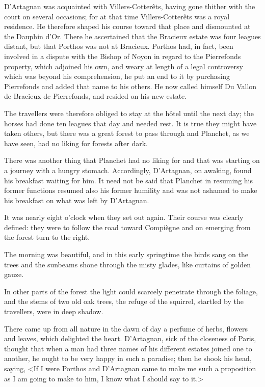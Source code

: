 D'Artagnan was acquainted with Villers-Cotterêts, having gone thither with the court on several occasions; for at that time Villers-Cotterêts was a royal residence. He therefore shaped his course toward that place and dismounted at the Dauphin d'Or. There he ascertained that the Bracieux estate was four leagues distant, but that Porthos was not at Bracieux. Porthos had, in fact, been involved in a dispute with the Bishop of Noyon in regard to the Pierrefonds property, which adjoined his own, and weary at length of a legal controversy which was beyond his comprehension, he put an end to it by purchasing Pierrefonds and added that name to his others. He now called himself Du Vallon de Bracieux de Pierrefonds, and resided on his new estate.

The travellers were therefore obliged to stay at the hôtel until the next day; the horses had done ten leagues that day and needed rest. It is true they might have taken others, but there was a great forest to pass through and Planchet, as we have seen, had no liking for forests after dark.

There was another thing that Planchet had no liking for and that was starting on a journey with a hungry stomach. Accordingly, D'Artagnan, on awaking, found his breakfast waiting for him. It need not be said that Planchet in resuming his former functions resumed also his former humility and was not ashamed to make his breakfast on what was left by D'Artagnan.

It was nearly eight o'clock when they set out again. Their course was clearly defined: they were to follow the road toward Compiègne and on emerging from the forest turn to the right.

The morning was beautiful, and in this early springtime the birds sang on the trees and the sunbeams shone through the misty glades, like curtains of golden gauze.

In other parts of the forest the light could scarcely penetrate through the foliage, and the stems of two old oak trees, the refuge of the squirrel, startled by the travellers, were in deep shadow.

There came up from all nature in the dawn of day a perfume of herbs, flowers and leaves, which delighted the heart. D'Artagnan, sick of the closeness of Paris, thought that when a man had three names of his different estates joined one to another, he ought to be very happy in such a paradise; then he shook his head, saying, <If I were Porthos and D'Artagnan came to make me such a proposition as I am going to make to him, I know what I should say to it.>


